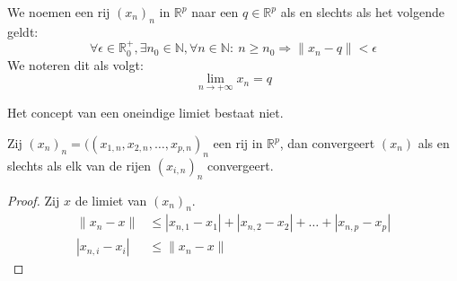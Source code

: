 \documentclass[main.tex]{subfiles}
\begin{document}
\begin{de}
  We noemen een rij $(x_{n})_{n}$ in $\mathbb{R}^{p}$  naar een $q\in \mathbb{R}^{p}$ als en slechts als het volgende geldt:
  \[ \forall \epsilon \in \mathbb{R}_{0}^{+}, \exists n_{0}\in \mathbb{N}, \forall n\in \mathbb{N}:\ n\ge n_{0} \Rightarrow \|x_{n}-q\| < \epsilon  \]
  We noteren dit als volgt:
  \[ \lim_{n\rightarrow +\infty}x_{n} = q \]
\end{de}

\begin{opm}
  Het concept van een oneindige limiet bestaat niet.
\end{opm}

\begin{st}
  Zij $(x_{n})_{n} = ((x_{1,n},x_{2,n},\dotsc,x_{p,n})_{n}$ een rij in $\mathbb{R}^{p}$, dan convergeert $(x_{n})$ als en slechts als elk van de rijen $(x_{i,n})_{n}$ convergeert.

  \begin{proof}
    Zij $x$ de limiet van $(x_{n})_{n}$.
    \begin{align*}
      \|x_{n}-x\| &\le |x_{n,1}-x_{1}| + |x_{n,2}-x_{2}| + \dotsc + |x_{n,p}-x_{p}|\\
      |x_{n,i}-x_{i}| &\le \|x_{n}-x\|
    \end{align*}
  \end{proof}
\end{st}
\end{document}
